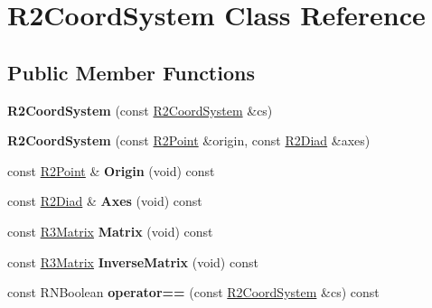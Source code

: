 \hypertarget{class_r2_coord_system}{}\section{R2\+Coord\+System Class Reference}
\label{class_r2_coord_system}
\subsection*{Public Member Functions}
\begin{DoxyCompactItemize}
\item 
{\bfseries R2\+Coord\+System} (const \hyperlink{class_r2_coord_system}{R2\+Coord\+System} \&cs)\hypertarget{class_r2_coord_system_a04c66519616e8fb048b6fe6b1fa0b042}{}\label{class_r2_coord_system_a04c66519616e8fb048b6fe6b1fa0b042}

\item 
{\bfseries R2\+Coord\+System} (const \hyperlink{class_r2_point}{R2\+Point} \&origin, const \hyperlink{class_r2_diad}{R2\+Diad} \&axes)\hypertarget{class_r2_coord_system_a0045a71d995d7871584d957daac10aa7}{}\label{class_r2_coord_system_a0045a71d995d7871584d957daac10aa7}

\item 
const \hyperlink{class_r2_point}{R2\+Point} \& {\bfseries Origin} (void) const \hypertarget{class_r2_coord_system_ad19469e62c89cdc27046572517e61026}{}\label{class_r2_coord_system_ad19469e62c89cdc27046572517e61026}

\item 
const \hyperlink{class_r2_diad}{R2\+Diad} \& {\bfseries Axes} (void) const \hypertarget{class_r2_coord_system_af39bab6594ed5e9aef852adeef22d596}{}\label{class_r2_coord_system_af39bab6594ed5e9aef852adeef22d596}

\item 
const \hyperlink{class_r3_matrix}{R3\+Matrix} {\bfseries Matrix} (void) const \hypertarget{class_r2_coord_system_a0ddacbef6099d2fd3560424359e8d665}{}\label{class_r2_coord_system_a0ddacbef6099d2fd3560424359e8d665}

\item 
const \hyperlink{class_r3_matrix}{R3\+Matrix} {\bfseries Inverse\+Matrix} (void) const \hypertarget{class_r2_coord_system_af79ccb4416148def85c4a5d0cb630334}{}\label{class_r2_coord_system_af79ccb4416148def85c4a5d0cb630334}

\item 
const R\+N\+Boolean {\bfseries operator==} (const \hyperlink{class_r2_coord_system}{R2\+Coord\+System} \&cs) const \hypertarget{class_r2_coord_system_a5957412e1f211f8968df766c33008007}{}\label{class_r2_coord_system_a5957412e1f211f8968df766c33008007}


\end{DoxyCompactItemize}
